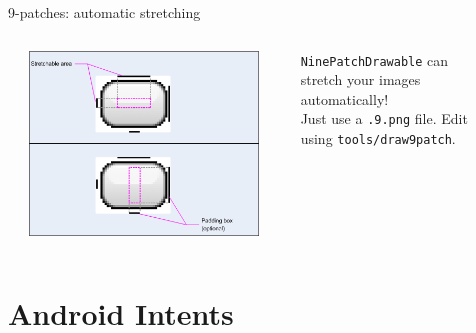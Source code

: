 \documentclass[aspectratio=169]{beamer}
\begin{document}
\begin{frame}{9-patches: automatic stretching}
\vspace{1em}
\begin{columns}
\begin{column}{0.02\textwidth}\end{column}
\begin{column}{0.60\textwidth}
\includegraphics[height=0.90\textheight]{img/ninepatch_raw.png} \\
\end{column}
\begin{column}{0.02\textwidth}\end{column}
\begin{column}{0.33\textwidth}
\raggedright
\texttt{NinePatchDrawable} can stretch your images automatically! \\
\vspace{2em}
Just use a {\tt .9.png} file.  Edit using {\tt tools/draw9patch}. \\
\end{column}
\begin{column}{0.03\textwidth}\end{column}
\end{columns}
\end{frame}



\section*{Android Intents}
\end{document}
